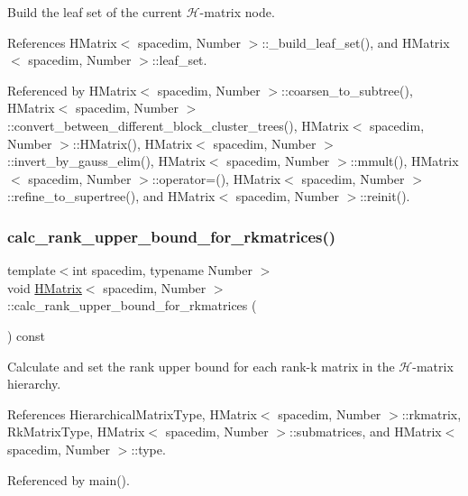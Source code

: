 Build the leaf set of the current $\mathcal{H}$-\/matrix node. 

References H\+Matrix$<$ spacedim, Number $>$\+::\+\_\+build\+\_\+leaf\+\_\+set(), and H\+Matrix$<$ spacedim, Number $>$\+::leaf\+\_\+set.



Referenced by H\+Matrix$<$ spacedim, Number $>$\+::coarsen\+\_\+to\+\_\+subtree(), H\+Matrix$<$ spacedim, Number $>$\+::convert\+\_\+between\+\_\+different\+\_\+block\+\_\+cluster\+\_\+trees(), H\+Matrix$<$ spacedim, Number $>$\+::\+H\+Matrix(), H\+Matrix$<$ spacedim, Number $>$\+::invert\+\_\+by\+\_\+gauss\+\_\+elim(), H\+Matrix$<$ spacedim, Number $>$\+::mmult(), H\+Matrix$<$ spacedim, Number $>$\+::operator=(), H\+Matrix$<$ spacedim, Number $>$\+::refine\+\_\+to\+\_\+supertree(), and H\+Matrix$<$ spacedim, Number $>$\+::reinit().

\mbox{\label{classHMatrix_a72191c447afaa0fd84505022cf1d174e}} 
\subsubsection{\texorpdfstring{calc\+\_\+rank\+\_\+upper\+\_\+bound\+\_\+for\+\_\+rkmatrices()}{calc\_rank\_upper\_bound\_for\_rkmatrices()}}
{\footnotesize\ttfamily template$<$int spacedim, typename Number $>$ \\
void \hyperlink{classHMatrix}{H\+Matrix}$<$ spacedim, Number $>$\+::calc\+\_\+rank\+\_\+upper\+\_\+bound\+\_\+for\+\_\+rkmatrices (\begin{DoxyParamCaption}{ }\end{DoxyParamCaption}) const}

Calculate and set the rank upper bound for each rank-\/k matrix in the $\mathcal{H}$-\/matrix hierarchy. 

References Hierarchical\+Matrix\+Type, H\+Matrix$<$ spacedim, Number $>$\+::rkmatrix, Rk\+Matrix\+Type, H\+Matrix$<$ spacedim, Number $>$\+::submatrices, and H\+Matrix$<$ spacedim, Number $>$\+::type.



Referenced by main().

\mbox{\label{classHMatrix_ae55bd45587b895bfdb977e7cbea46519}} 
